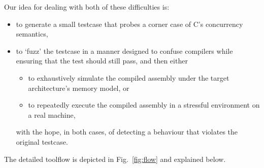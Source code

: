 \documentclass[acmsmall,review]{acmart}
\begin{document}
Our idea for dealing with both of these difficulties is:
\begin{itemize}

\item to generate a small testcase that probes a corner case of C's concurrency semantics,
\item to `fuzz' the testcase in a manner designed to confuse compilers while ensuring that the test should still pass, and then either
\begin{itemize}
\item to exhaustively simulate the compiled assembly under the target architecture's memory model, or
\item to repeatedly execute the compiled assembly in a stressful environment on a real machine,
\end{itemize}
with the hope, in both cases, of detecting a behaviour that violates the original testcase.
\end{itemize}

The detailed toolflow is depicted in Fig.~\ref{fig:flow} and explained below.
\end{document}
